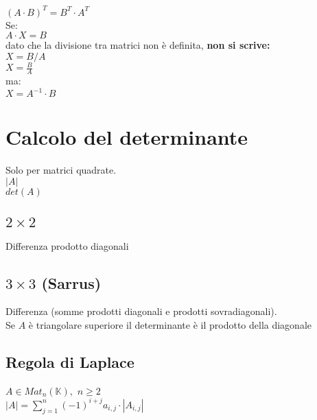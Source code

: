 \documentclass[a4paper, twoside, italian, 11pt]{book}
\newcommand{\detm}[1] {\left | #1 \right |}
\newcommand{\K}{\mathbb K}
\begin{document}
\noindent
$(A \cdot B)^T = B^T \cdot A^T$ \\

\noindent
Se: \\

$A \cdot X = B$ \\

\noindent
dato che la divisione tra matrici non è definita, \textbf{non si scrive:} \\

$X = B / A$ \\
\indent
$X = \frac{B}{A}$ \\

\noindent
ma: \\

$X = A^{-1} \cdot B$



\section{Calcolo del determinante}

Solo per matrici quadrate. \\

\noindent
$\detm A$ \\

\noindent
$det(A)$



\subsection{$2 \times 2$}

Differenza prodotto diagonali


\subsection{$3 \times 3$ (Sarrus)}

Differenza (somme prodotti diagonali e prodotti sovradiagonali). \\

\noindent
Se $A$ è triangolare superiore il determinante è il prodotto della diagonale


\subsection{Regola di Laplace}

$A \in Mat_n(\K),$ $n \geq 2$ \\

\noindent
$\detm A = \sum\limits_{j=1}^{n} (-1)^{i+j} a_{i,j} \cdot \detm{A_{i,j}} $ \\
\end{document}
